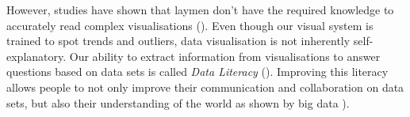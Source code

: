 However, studies have shown that laymen don't have the required knowledge to accurately read complex visualisations (\cite{borner_investigating_2016}). %
Even though our visual system is trained to spot trends and outliers, data visualisation is not inherently self-explanatory. Our ability to extract information from visualisations to answer questions based on data sets is called \emph{Data Literacy} (\cite{boy_principled_2014}). Improving this literacy allows people to not only improve their communication and collaboration on data sets, but also their understanding of the world as shown by big data \cite{borner_data_2019}). 
